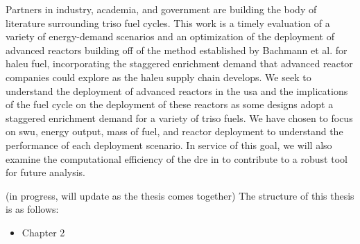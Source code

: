 Partners in industry, academia, and government are building the body of
literature surrounding \gls{triso} fuel cycles. This work is a timely
evaluation of a variety of energy-demand scenarios and an optimization of the
deployment of advanced reactors building off of the method established by
Bachmann et al. \cite{bachmann_enrichment_2021} for \gls{haleu} fuel,
incorporating the staggered enrichment demand that advanced reactor
companies could explore as the \gls{haleu} supply chain
develops. We seek to understand the deployment of advanced reactors in the
\gls{usa} and the implications of the fuel cycle on the deployment of these
reactors as some designs adopt a staggered enrichment demand for a variety of
\gls{triso} fuels. We have chosen to focus on \gls{swu},
energy output, mass of fuel, and reactor deployment to understand
the performance of each deployment scenario. In
service of this goal, we will also examine the computational efficiency of the
\gls{dre} in \cyclus to contribute to a robust tool for future analysis.


\pagebreak

(in progress, will update as the thesis comes together)
The structure of this thesis is as follows:

\begin{itemize}
    \item Chapter 2
\end{itemize}